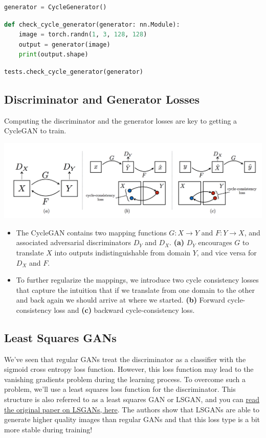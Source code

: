 \begin{lstlisting}[language=Python]
generator = CycleGenerator()
\end{lstlisting}

\begin{lstlisting}[language=Python]
def check_cycle_generator(generator: nn.Module):
    image = torch.randn(1, 3, 128, 128)
    output = generator(image)
    print(output.shape)
\end{lstlisting}

\begin{lstlisting}[language=Python]
tests.check_cycle_generator(generator)
\end{lstlisting}

\subsection{Discriminator and Generator Losses}
Computing the discriminator and the generator losses are key to getting a CycleGAN to train.

\includegraphics[width=1\linewidth]{img//genAdvNet//image2image/CycleGAN_loss.png}

\begin{itemize}
\item The CycleGAN contains two mapping functions \(G: X \rightarrow Y\) and \(F: Y \rightarrow X\), and associated adversarial discriminators \(D_Y\) and \(D_X\). \textbf{(a)} \(D_Y\) encourages \(G\) to translate \(X\) into outputs indistinguishable from domain \(Y\), and vice versa for \(D_X\) and \(F\).
\item To further regularize the mappings, we introduce two cycle consistency losses that capture the intuition that if we translate from one domain to the other and back again we should arrive at where we started. \textbf{(b)} Forward cycle-consistency loss and \textbf{(c)} backward cycle-consistency loss.
\end{itemize}
\subsection{Least Squares GANs}
We've seen that regular GANs treat the discriminator as a classifier
with the sigmoid cross entropy loss function. However, this loss
function may lead to the vanishing gradients problem during the learning
process. To overcome such a problem, we'll use a least squares loss
function for the discriminator. This structure is also referred to as a
least squares GAN or LSGAN, and you can
\href{https://arxiv.org/pdf/1611.04076.pdf}{read the original paper on
LSGANs, here}. The authors show that LSGANs are able to generate higher
quality images than regular GANs and that this loss type is a bit more
stable during training!

